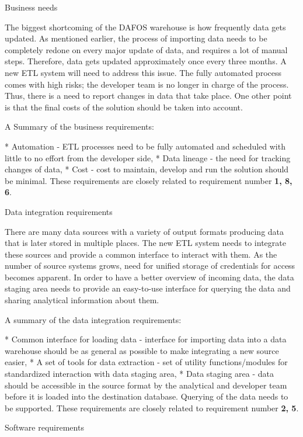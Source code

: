 \secc Business needs

The biggest shortcoming of the DAFOS warehouse is how frequently data gets updated. As mentioned earlier, the process of importing data needs to be completely redone on every major update of data, and requires a lot of manual steps. Therefore, data gets updated approximately once every three months. A new ETL system will need to address this issue. The fully automated process comes with high risks; the developer team is no longer in charge of the process. Thus, there is a need to report changes in data that take place. One other point is that the final costs of the solution should be taken into account.

A Summary of the business requirements:

\begitems
* Automation - ETL processes need to be fully automated and scheduled with little to no effort from the developer side,
* Data lineage - the need for tracking changes of data,
* Cost - cost to maintain, develop and run the solution should be minimal.
\enditems
These requirements are closely related to requirement number {\bf 1, 8, 6}.

\secc Data integration requirements

There are many data sources with a variety of output formats producing data that is later stored in multiple places. The new ETL system needs to  integrate these sources and provide a common interface to interact with them. As the number of source systems grows, need for unified storage of credentials for access becomes apparent. In order to have a better overview of incoming data, the data staging area needs to provide an easy-to-use interface for querying the data and sharing analytical information about them. 

A summary of the data integration requirements:

\begitems
* Common interface for loading data - interface for importing data into a data warehouse should be as general as possible to make integrating a new source easier,
* A set of tools for data extraction - set of utility functions/modules for standardized interaction with data staging area,
* Data staging area - data should be accessible in the source format by the analytical and developer team before it is loaded into the destination database. Querying of the data needs to be supported.
\enditems
These requirements are closely related to requirement number {\bf 2, 5}.


\secc Software requirements

